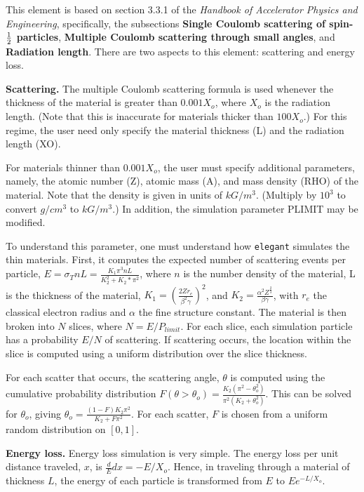 \pagestyle{plain}
\newenvironment{req}{\begin{equation} \rm}{\end{equation}}
\setlength{\topmargin}{0.15 in}
\setlength{\oddsidemargin}{0 in}
\setlength{\evensidemargin}{0 in} %
\setlength{\textwidth}{6.5 in}
\setlength{\headheight}{-0.5 in} %
\setlength{\footheight}{0 in}
\setlength{\textheight}{9 in}


This element is based on section 3.3.1 of the {\em Handbook of
Accelerator Physics and Engineering}, specifically, the
subsections {\bf Single Coulomb scattering of spin-${\rm \frac{1}{2}}$
particles}, {\bf Multiple Coulomb scattering through small angles},
and {\bf Radiation length}.
There are two aspects to this element: scattering and energy loss.

{\bf Scattering.}  The multiple Coulomb scattering formula is used
whenever the thickness of the material is greater than $0.001 X_o$,
where $X_o$ is the radiation length.  (Note that this is inaccurate
for materials thicker than $100 X_o$.)  For this regime, the user need
only specify the material thickness (L) and the radiation length (XO).

For materials thinner than $0.001 X_o$, the user must specify
additional parameters, namely, the atomic number (Z), atomic mass (A),
and mass density (RHO) of the material.  Note that the density is
given in units of $kG/m^3$.  (Multiply by $10^3$ to convert $g/cm^3$
to $kG/m^3$.)  In addition, the simulation parameter PLIMIT may be
modified.  

To understand this parameter, one must understand how {\tt elegant}
simulates the thin materials.  First, it computes the expected number
of scattering events per particle, $ E = \sigma_T n L = \frac{K_1
\pi^3 n L}{K_2^2 + K_2*\pi^2} $, where $n$ is the number density of
the material, L is the thickness of the material, $K_1 = (\frac{2 Z
r_e}{\beta^2 \gamma})^2$, and $K_2 = \frac{\alpha^2
Z^\frac{2}{3}}{\beta\gamma}$, with $r_e$ the classical electron radius
and $\alpha$ the fine structure constant.  The material is then broken
into $N$ slices, where $N = E/P_{limit}$.  For each slice, each
simulation particle has a probability $E/N$ of scattering.  If scattering
occurs, the location within the slice is computed using a uniform
distribution over the slice thickness.

For each scatter that occurs, the scattering angle, $\theta$ is
computed using the cumulative probability distribution
$F(\theta>\theta_o) = \frac{K_2 (\pi^2 - \theta_o^2)}{\pi^2 (K_2 +
\theta_o^2)}$.  This can be solved for $\theta_o$, giving
$\theta_o = \frac{(1-F)K_2\pi^2}{K_2 + F \pi^2}$.  For each scatter,
$F$ is chosen from a uniform random distribution on $[0,1]$.

{\bf Energy loss.}  Energy loss simulation is very simple.
The energy loss per unit distance traveled, $x$, is 
${\frac dE}{dx} = -E/X_o$.  Hence, in traveling through a
material of thickness $L$, the energy of each particle is
transformed from $E$ to $E e^{-L/X_o}$.  

